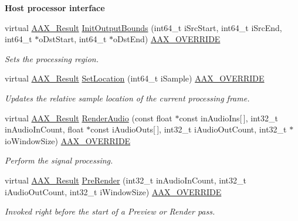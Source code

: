 \begin{Indent}{\bf Host processor interface}\par
\begin{DoxyCompactItemize}
\item 
virtual \hyperlink{a00149_a4d8f69a697df7f70c3a8e9b8ee130d2f}{A\+A\+X\+\_\+\+Result} \hyperlink{a00020_a79ef65fd98f14144beb708061fba884e}{Init\+Output\+Bounds} (int64\+\_\+t i\+Src\+Start, int64\+\_\+t i\+Src\+End, int64\+\_\+t $\ast$o\+Dst\+Start, int64\+\_\+t $\ast$o\+Dst\+End) \hyperlink{a00149_ac2f24a5172689ae684344abdcce55463}{A\+A\+X\+\_\+\+O\+V\+E\+R\+R\+I\+D\+E}
\begin{DoxyCompactList}\small\item\em Sets the processing region. \end{DoxyCompactList}\item 
virtual \hyperlink{a00149_a4d8f69a697df7f70c3a8e9b8ee130d2f}{A\+A\+X\+\_\+\+Result} \hyperlink{a00020_a0bea1943fa89cdd227302247595482c8}{Set\+Location} (int64\+\_\+t i\+Sample) \hyperlink{a00149_ac2f24a5172689ae684344abdcce55463}{A\+A\+X\+\_\+\+O\+V\+E\+R\+R\+I\+D\+E}
\begin{DoxyCompactList}\small\item\em Updates the relative sample location of the current processing frame. \end{DoxyCompactList}\item 
virtual \hyperlink{a00149_a4d8f69a697df7f70c3a8e9b8ee130d2f}{A\+A\+X\+\_\+\+Result} \hyperlink{a00020_ab8fd8661bd7f58d9e771cd4c37a17f8f}{Render\+Audio} (const float $\ast$const in\+Audio\+Ins\mbox{[}$\,$\mbox{]}, int32\+\_\+t in\+Audio\+In\+Count, float $\ast$const i\+Audio\+Outs\mbox{[}$\,$\mbox{]}, int32\+\_\+t i\+Audio\+Out\+Count, int32\+\_\+t $\ast$io\+Window\+Size) \hyperlink{a00149_ac2f24a5172689ae684344abdcce55463}{A\+A\+X\+\_\+\+O\+V\+E\+R\+R\+I\+D\+E}
\begin{DoxyCompactList}\small\item\em Perform the signal processing. \end{DoxyCompactList}\item 
virtual \hyperlink{a00149_a4d8f69a697df7f70c3a8e9b8ee130d2f}{A\+A\+X\+\_\+\+Result} \hyperlink{a00020_afb0d1b047d76ab4ad2df2618111fc2c6}{Pre\+Render} (int32\+\_\+t in\+Audio\+In\+Count, int32\+\_\+t i\+Audio\+Out\+Count, int32\+\_\+t i\+Window\+Size) \hyperlink{a00149_ac2f24a5172689ae684344abdcce55463}{A\+A\+X\+\_\+\+O\+V\+E\+R\+R\+I\+D\+E}
\begin{DoxyCompactList}\small\item\em Invoked right before the start of a Preview or Render pass. \end{DoxyCompactList}\item 

\end{DoxyCompactItemize}
\end{Indent}
